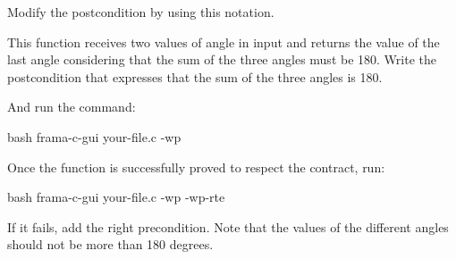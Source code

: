 Modify the postcondition by using this notation.






This function receives two values of angle in input and returns the value
of the last angle considering that the sum of the three angles must be 180.
Write the postcondition that expresses that the sum of the three angles is
180.





And run the command:


\begin{CodeBlock}{bash}
frama-c-gui your-file.c -wp
\end{CodeBlock}


Once the function is successfully proved to respect the contract, run:


\begin{CodeBlock}{bash}
frama-c-gui your-file.c -wp -wp-rte
\end{CodeBlock}



If it fails, add the right precondition. Note that the values of the different
angles should not be more than 180 degrees.
